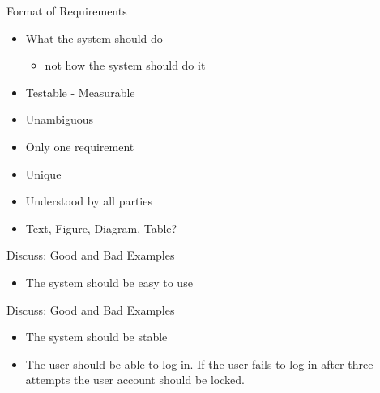 \documentclass[10pt,t,a4paper]{beamer}
\begin{document}
\begin{frame}[label=sec-1-11]{Format of Requirements}
\begin{itemize}
\item What the system should do
\begin{itemize}
\item not how the system should do it
\end{itemize}
\item Testable - Measurable
\item Unambiguous
\item Only one requirement
\item Unique
\item Understood by all parties

\item Text, Figure, Diagram, Table?
\end{itemize}
\end{frame}
\begin{frame}[label=sec-1-12]{Discuss: Good and Bad Examples}
\begin{itemize}
\item The system should be easy to use
\end{itemize}
\end{frame}
\begin{frame}[label=sec-1-13]{Discuss: Good and Bad Examples}
\begin{itemize}
\item The system should be stable
\item The user should be able to log in. If the user fails to log in after three attempts the user account should be locked.
\end{itemize}
\end{frame}
\end{document}
